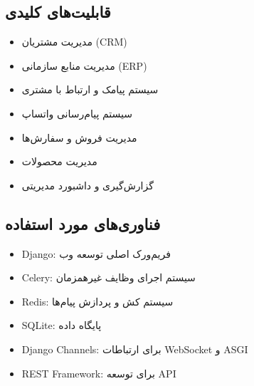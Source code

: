 \documentclass[letterpaper,10pt,english]{sphinxmanual}
\begin{document}
\subsection{قابلیت‌های کلیدی}
\label{\detokenize{introduction/index:id3}}\begin{itemize}
\item {} 
\sphinxAtStartPar
مدیریت مشتریان (CRM)

\item {} 
\sphinxAtStartPar
مدیریت منابع سازمانی (ERP)

\item {} 
\sphinxAtStartPar
سیستم پیامک و ارتباط با مشتری

\item {} 
\sphinxAtStartPar
سیستم پیام‌رسانی واتساپ

\item {} 
\sphinxAtStartPar
مدیریت فروش و سفارش‌ها

\item {} 
\sphinxAtStartPar
مدیریت محصولات

\item {} 
\sphinxAtStartPar
گزارش‌گیری و داشبورد مدیریتی

\end{itemize}


\subsection{فناوری‌های مورد استفاده}
\label{\detokenize{introduction/index:id4}}\begin{itemize}
\item {} 
\sphinxAtStartPar
Django: فریم‌ورک اصلی توسعه وب

\item {} 
\sphinxAtStartPar
Celery: سیستم اجرای وظایف غیرهمزمان

\item {} 
\sphinxAtStartPar
Redis: سیستم کش و پردازش پیام‌ها

\item {} 
\sphinxAtStartPar
SQLite: پایگاه داده

\item {} 
\sphinxAtStartPar
Django Channels: برای ارتباطات WebSocket و ASGI

\item {} 
\sphinxAtStartPar
REST Framework: برای توسعه API

\end{itemize}

\sphinxstepscope
\end{document}
